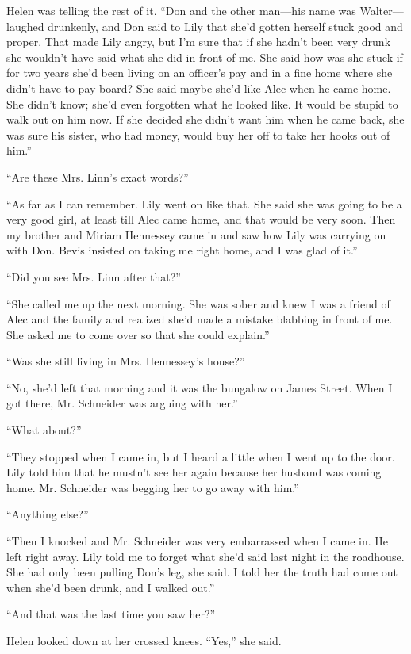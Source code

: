 \documentclass{novel}
\begin{document}
{Helen was telling the rest of it. “Don and the other man—his name was Walter—laughed drunkenly, and Don said to Lily that she’d gotten herself stuck good and proper. That made Lily angry, but I’m sure that if she hadn’t been very drunk she wouldn’t have said what she did in front of me. She said how was she stuck if for two years she’d been living on an officer’s pay and in a fine home where she didn’t have to pay board? She said maybe she’d like Alec when he came home. She didn’t know; she’d even forgotten what he looked like. It would be stupid to walk out on him now. If she decided she didn’t want him when he came back, she was sure his sister, who had money, would buy her off to take her hooks out of him.”

“Are these Mrs. Linn’s exact words?”

“As far as I can remember. Lily went on like that. She said she was going to be a very good girl, at least till Alec came home, and that would be very soon. Then my brother and Miriam Hennessey came in and saw how Lily was carrying on with Don. Bevis insisted on taking me right home, and I was glad of it.”

“Did you see Mrs. Linn after that?”

“She called me up the next morning. She was sober and knew I was a friend of Alec and the family and realized she’d made a mistake blabbing in front of me. She asked me to come over so that she could explain.”

“Was she still living in Mrs. Hennessey’s house?”

“No, she’d left that morning and it was the bungalow on James Street. When I got there, Mr. Schneider was arguing with her.”

“What about?”

“They stopped when I came in, but I heard a little when I went up to the door. Lily told him that he mustn’t see her again because her husband was coming home. Mr. Schneider was begging her to go away with him.”

“Anything else?”

“Then I knocked and Mr. Schneider was very embarrassed when I came in. He left right away. Lily told me to forget what she’d said last night in the roadhouse. She had only been pulling Don’s leg, she said. I told her the truth had come out when she’d been drunk, and I walked out.”

“And that was the last time you saw her?”

Helen looked down at her crossed knees. “Yes,” she said.

}
\end{document}
